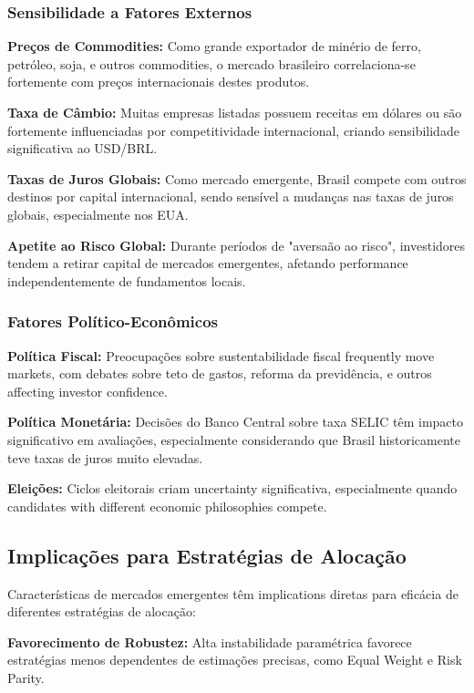 \subsubsection{Sensibilidade a Fatores Externos}

\textbf{Preços de Commodities:} Como grande exportador de minério de ferro, petróleo, soja, e outros commodities, o mercado brasileiro correlaciona-se fortemente com preços internacionais destes produtos.

\textbf{Taxa de Câmbio:} Muitas empresas listadas possuem receitas em dólares ou são fortemente influenciadas por competitividade internacional, criando sensibilidade significativa ao USD/BRL.

\textbf{Taxas de Juros Globais:} Como mercado emergente, Brasil compete com outros destinos por capital internacional, sendo sensível a mudanças nas taxas de juros globais, especialmente nos EUA.

\textbf{Apetite ao Risco Global:} Durante períodos de "aversaão ao risco", investidores tendem a retirar capital de mercados emergentes, afetando performance independentemente de fundamentos locais.

\subsubsection{Fatores Político-Econômicos}

\textbf{Política Fiscal:} Preocupações sobre sustentabilidade fiscal frequently move markets, com debates sobre teto de gastos, reforma da previdência, e outros affecting investor confidence.

\textbf{Política Monetária:} Decisões do Banco Central sobre taxa SELIC têm impacto significativo em avaliações, especialmente considerando que Brasil historicamente teve taxas de juros muito elevadas.

\textbf{Eleições:} Ciclos eleitorais criam uncertainty significativa, especialmente quando candidates with different economic philosophies compete.

\subsection{Implicações para Estratégias de Alocação}

Características de mercados emergentes têm implications diretas para eficácia de diferentes estratégias de alocação:

\textbf{Favorecimento de Robustez:} Alta instabilidade paramétrica favorece estratégias menos dependentes de estimações precisas, como Equal Weight e Risk Parity.

